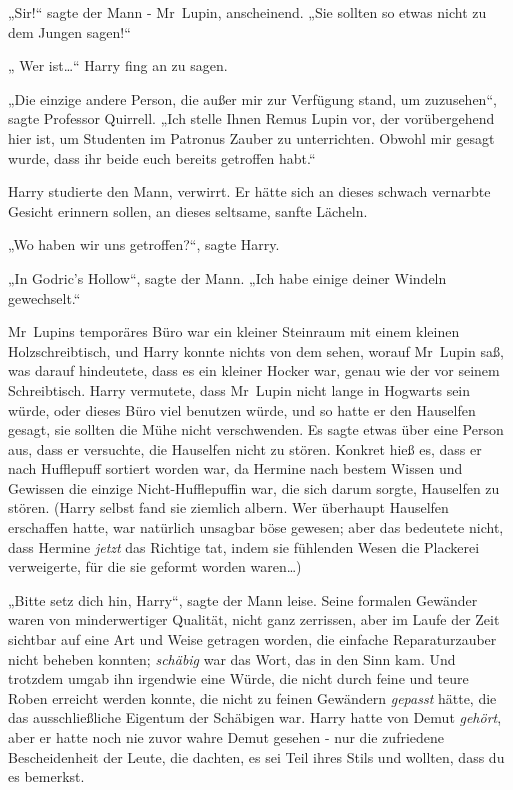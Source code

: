 {„Sir!“ sagte der Mann - Mr~Lupin, anscheinend. „Sie sollten so etwas nicht zu dem Jungen sagen!“

„ Wer ist…“ Harry fing an zu sagen.

„Die einzige andere Person, die außer mir zur Verfügung stand, um zuzusehen“, sagte Professor Quirrell. „Ich stelle Ihnen Remus Lupin vor, der vorübergehend hier ist, um Studenten im Patronus Zauber zu unterrichten. Obwohl mir gesagt wurde, dass ihr beide euch bereits getroffen habt.“

Harry studierte den Mann, verwirrt. Er hätte sich an dieses schwach vernarbte Gesicht erinnern sollen, an dieses seltsame, sanfte Lächeln.

„Wo haben wir uns getroffen?“, sagte Harry.

„In Godric's Hollow“, sagte der Mann. „Ich habe einige deiner Windeln gewechselt.“

Mr~Lupins temporäres Büro war ein kleiner Steinraum mit einem kleinen Holzschreibtisch, und Harry konnte nichts von dem sehen, worauf Mr~Lupin saß, was darauf hindeutete, dass es ein kleiner Hocker war, genau wie der vor seinem Schreibtisch. Harry vermutete, dass Mr~Lupin nicht lange in Hogwarts sein würde, oder dieses Büro viel benutzen würde, und so hatte er den Hauselfen gesagt, sie sollten die Mühe nicht verschwenden. Es sagte etwas über eine Person aus, dass er versuchte, die Hauselfen nicht zu stören. Konkret hieß es, dass er nach Hufflepuff sortiert worden war, da Hermine nach bestem Wissen und Gewissen die einzige Nicht-Hufflepuffin war, die sich darum sorgte, Hauselfen zu stören. (Harry selbst fand sie ziemlich albern. Wer überhaupt Hauselfen erschaffen hatte, war natürlich unsagbar böse gewesen; aber das bedeutete nicht, dass Hermine \emph{jetzt} das Richtige tat, indem sie fühlenden Wesen die Plackerei verweigerte, für die sie geformt worden waren…)

„Bitte setz dich hin, Harry“, sagte der Mann leise. Seine formalen Gewänder waren von minderwertiger Qualität, nicht ganz zerrissen, aber im Laufe der Zeit sichtbar auf eine Art und Weise getragen worden, die einfache Reparaturzauber nicht beheben konnten; \emph{schäbig} war das Wort, das in den Sinn kam. Und trotzdem umgab ihn irgendwie eine Würde, die nicht durch feine und teure Roben erreicht werden konnte, die nicht zu feinen Gewändern \emph{gepasst} hätte, die das ausschließliche Eigentum der Schäbigen war. Harry hatte von Demut \emph{gehört}, aber er hatte noch nie zuvor wahre Demut gesehen - nur die zufriedene Bescheidenheit der Leute, die dachten, es sei Teil ihres Stils und wollten, dass du es bemerkst.

}
